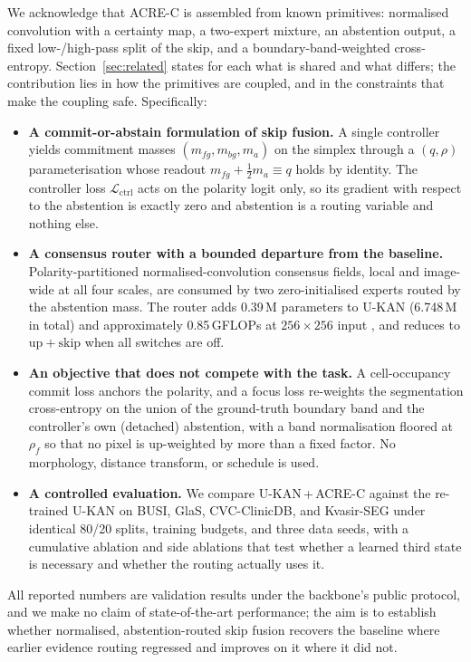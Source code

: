 We acknowledge that ACRE-C is assembled from known primitives: normalised convolution with a certainty map, a two-expert mixture, an abstention output, a fixed low-/high-pass split of the skip, and a boundary-band-weighted cross-entropy. Section~\ref{sec:related} states for each what is shared and what differs; the contribution lies in how the primitives are coupled, and in the constraints that make the coupling safe. Specifically:
\begin{itemize}
    \item \textbf{A commit-or-abstain formulation of skip fusion.} A single controller yields commitment masses $(m_{fg}, m_{bg}, m_a)$ on the simplex through a $(q,\rho)$ parameterisation whose readout $m_{fg}+\tfrac{1}{2}m_a\equiv q$ holds by identity. The controller loss $\mathcal{L}_{\mathrm{ctrl}}$ acts on the polarity logit only, so its gradient with respect to the abstention is exactly zero and abstention is a routing variable and nothing else.
    \item \textbf{A consensus router with a bounded departure from the baseline.} Polarity-partitioned normalised-convolution consensus fields, local and image-wide at all four scales, are consumed by two zero-initialised experts routed by the abstention mass. The router adds 0.39\,M parameters to U-KAN (6.748\,M in total) and approximately 0.85\,GFLOPs at $256\times256$ input%
    , and reduces to $\mathrm{up}+\mathrm{skip}$ when all switches are off.
    \item \textbf{An objective that does not compete with the task.} A cell-occupancy commit loss anchors the polarity, and a focus loss re-weights the segmentation cross-entropy on the union of the ground-truth boundary band and the controller's own (detached) abstention, with a band normalisation floored at $\rho_f$ so that no pixel is up-weighted by more than a fixed factor. No morphology, distance transform, or schedule is used.
    \item \textbf{A controlled evaluation.} We compare U-KAN\,+\,ACRE-C against the re-trained U-KAN on BUSI, GlaS, CVC-ClinicDB, and Kvasir-SEG under identical 80/20 splits, training budgets, and three data seeds, with a cumulative ablation and side ablations that test whether a learned third state is necessary and whether the routing actually uses it. 
\end{itemize}
All reported numbers are validation results under the backbone's public protocol, and we make no claim of state-of-the-art performance; the aim is to establish whether normalised, abstention-routed skip fusion recovers the baseline where earlier evidence routing regressed and improves on it where it did not.
